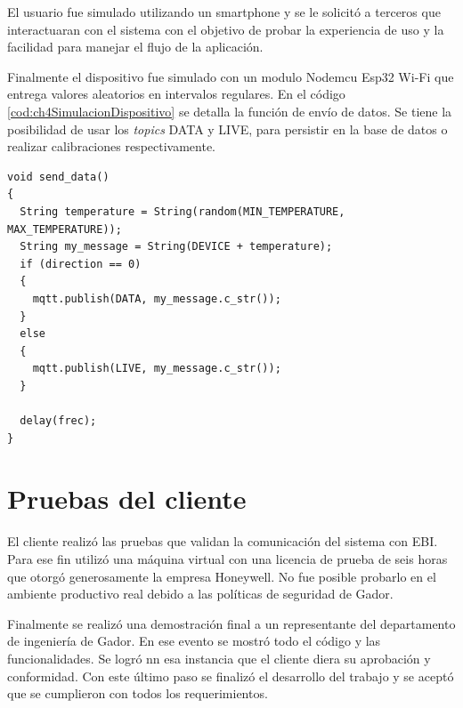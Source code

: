 El usuario fue simulado utilizando un smartphone y se le solicitó a terceros que interactuaran con el sistema con el objetivo de probar la experiencia de uso y la facilidad para manejar el flujo de la aplicación.

Finalmente el dispositivo fue simulado con un modulo Nodemcu Esp32 Wi-Fi que entrega valores aleatorios en intervalos regulares.
En el código \ref{cod:ch4SimulacionDispositivo} se detalla la función de envío de datos.
Se tiene la posibilidad de usar los \emph{topics} DATA y LIVE, para persistir en la base de datos o realizar calibraciones respectivamente.

\begin{lstlisting}[label=cod:ch4SimulacionDispositivo,caption=Función de envío de datos.]
void send_data()
{
  String temperature = String(random(MIN_TEMPERATURE, MAX_TEMPERATURE));
  String my_message = String(DEVICE + temperature);
  if (direction == 0)
  {
    mqtt.publish(DATA, my_message.c_str());
  }
  else
  {
    mqtt.publish(LIVE, my_message.c_str());
  }

  delay(frec);
}
\end{lstlisting}

\section{Pruebas del cliente}

El cliente realizó las pruebas que validan la comunicación del sistema con EBI.
Para ese fin utilizó una máquina virtual con una licencia de prueba de seis horas que otorgó generosamente la empresa Honeywell.
No fue posible probarlo en el ambiente productivo real debido a las políticas de seguridad de Gador.

Finalmente se realizó una demostración final a un representante del departamento de ingeniería de Gador.
En ese evento se mostró todo el código y las funcionalidades.
Se logró nn esa instancia que el cliente diera su aprobación y conformidad.
Con este último paso se finalizó el desarrollo del trabajo y se aceptó que se cumplieron con todos los requerimientos.
